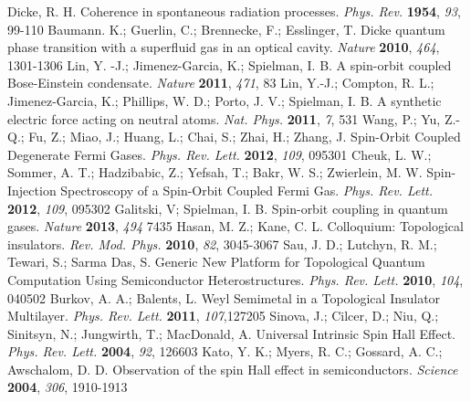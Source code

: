 \documentclass[atoms,article,submit,moreauthors,pdftex,12pt,a4paper]{mdpi}
\begin{document}
\begin{thebibliography}{999}

Dicke, R. H. Coherence in spontaneous radiation processes. {\em Phys. Rev.} {\bf 1954}, {\em 93}, 99-110
Baumann. K.; Guerlin, C.; Brennecke, F.; Esslinger, T. Dicke quantum phase transition with a superfluid gas in an optical cavity. {\em Nature} {\bf 2010}, {\em 464}, 1301-1306   
Lin, Y. -J.; Jimenez-Garcia, K.; Spielman, I. B. A spin-orbit coupled Bose-Einstein condensate. {\em Nature} {\bf 2011}, {\em 471}, 83
Lin, Y.-J.; Compton, R. L.; Jimenez-Garcia, K.; Phillips, W. D.; Porto, J. V.; Spielman, I. B. A synthetic electric force acting on neutral atoms. {\em Nat. Phys.} {\bf 2011}, {\em 7}, 531
Wang, P.; Yu, Z.-Q.; Fu, Z.; Miao, J.; Huang, L.; Chai, S.; Zhai, H.; Zhang, J. Spin-Orbit Coupled Degenerate Fermi Gases. {\em Phys. Rev. Lett.} {\bf 2012}, {\em 109}, 095301
Cheuk, L. W.; Sommer, A. T.; Hadzibabic, Z.; Yefsah, T.; Bakr, W. S.; Zwierlein, M. W. Spin-Injection Spectroscopy of a Spin-Orbit Coupled Fermi Gas. {\em Phys. Rev. Lett.} {\bf 2012}, {\em 109}, 095302
Galitski, V; Spielman, I. B. Spin-orbit coupling in quantum gases. {\em Nature} {\bf 2013}, {\em 494} 7435
Hasan, M. Z.; Kane, C. L. Colloquium: Topological insulators. {\em Rev. Mod. Phys.} {\bf 2010}, {\em 82}, 3045-3067
Sau, J. D.; Lutchyn, R. M.; Tewari, S.; Sarma Das, S. Generic New Platform for Topological Quantum Computation Using Semiconductor Heterostructures. {\em Phys. Rev. Lett.} {\bf 2010}, {\em 104}, 040502
Burkov, A. A.; Balents, L. Weyl Semimetal in a Topological Insulator Multilayer. {\em Phys. Rev. Lett.} {\bf 2011}, {\em 107},127205
Sinova, J.; Cilcer, D.; Niu, Q.; Sinitsyn, N.; Jungwirth, T.; MacDonald, A. Universal Intrinsic Spin Hall Effect. {\em Phys. Rev. Lett.} {\bf 2004}, {\em 92}, 126603
Kato, Y. K.; Myers, R. C.; Gossard, A. C.; Awschalom, D. D. Observation of the spin Hall effect in semiconductors. {\em Science} {\bf 2004}, {\em 306}, 1910-1913

\end{thebibliography}
\end{document}
